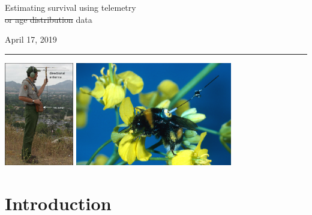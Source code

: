 \documentclass[color=usenames,dvipsnames]{beamer}\usepackage[]{graphicx}\usepackage[]{color}
\begin{document}

\begin{frame}[plain]
  \begin{center}
    {\huge Estimating survival using telemetry \\ 
      \st{or age distribution} data \par}
    \vspace{0.5cm}
    { \Large April 17, 2019} \\
    {\color{blue} \rule{\textwidth}{1pt}}
    \vfill
    \includegraphics[height=4.5cm,keepaspectratio]{figs/radiotelemetry} %
    \hspace{0.5cm}
      \includegraphics[height=4.5cm,keepaspectratio]{figs/bbee}
  \end{center}
\end{frame}




\section{Introduction}
\end{document}
